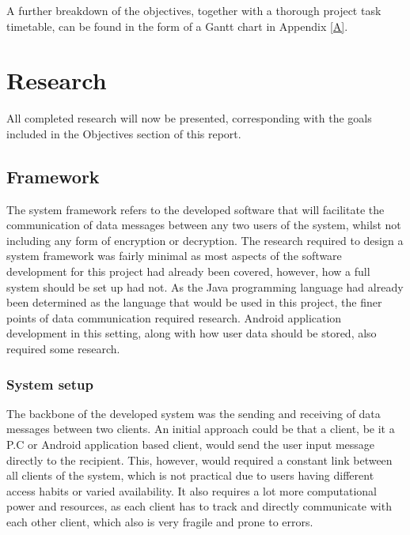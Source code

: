 \documentclass[a4paper,12pt]{report}
\begin{document}
A further breakdown of the objectives, together with a thorough project task timetable, can be found in the form of a Gantt chart in Appendix \ref{A}.

\chapter{Research}

All completed research will now be presented, corresponding with the goals included in the Objectives section of this report. 

\section{Framework}

The system framework refers to the developed software that will facilitate the communication of data messages between any two users of the system, whilst not including any form of encryption or decryption. The research required to design a system framework was fairly minimal as most aspects of the software development for this project had already been covered, however, how a full system should be set up had not. As the Java programming language had already been determined as the language that would be used in this project, the finer points of data communication required research. Android application development in this setting, along with how user data should be stored, also required some research. 

\subsection{System setup}


The backbone of the developed system was the sending and receiving of data messages between two clients. An initial approach could be that a client, be it a P.C or Android application based client, would send the user input message directly to the recipient. This, however, would required a constant link between all clients of the system, which is not practical due to users having different access habits or varied availability. It also requires a lot more computational power and resources, as each client has to track and directly communicate with each other client, which also is very fragile and prone to errors. 
\end{document}
